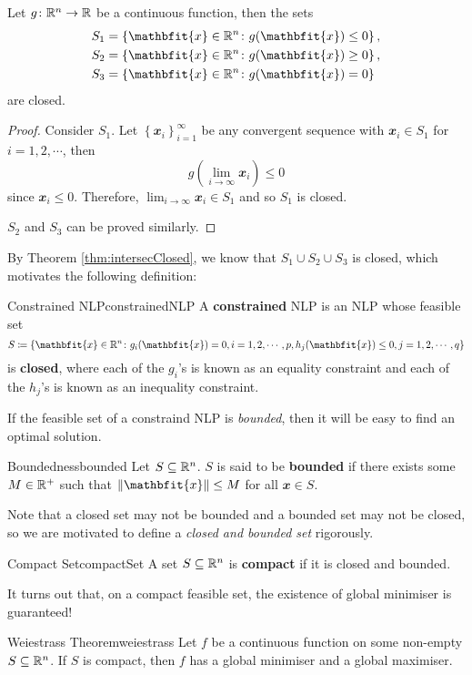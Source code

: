 \documentclass[math, code]{amznotes}
\theoremstyle{remark}
\begin{document}
\begin{probox}{}{}
    Let $g \colon \mathbb{R}^n \to \mathbb{R}$ be a continuous function, then the sets
    \begin{align*}
        S_1 & = \left\{\mathbfit{x} \in \R^n \colon g(\mathbfit{x}) \leq 0\right\}, \\
        S_2 & = \left\{\mathbfit{x} \in \R^n \colon g(\mathbfit{x}) \geq 0\right\}, \\
        S_3 & = \left\{\mathbfit{x} \in \R^n \colon g(\mathbfit{x}) = 0\right\}
    \end{align*}
    are closed.
    \tcblower
    \begin{proof}
        Consider $S_1$. Let $\left\{\mathbfit{x}_i\right\}_{i = 1}^\infty$ be any convergent sequence with $\mathbfit{x}_i \in S_1$ for $i = 1, 2, \cdots$, then
        \begin{equation*}
            g\left(\lim_{i \to \infty}\mathbfit{x}_i\right) \leq 0
        \end{equation*}
        since $\mathbfit{x}_i \leq 0$. Therefore, $\lim_{i \to \infty}\mathbfit{x}_i \in S_1$ and so $S_1$ is closed.

        $S_2$ and $S_3$ can be proved similarly.
    \end{proof}
\end{probox}
By Theorem \ref{thm:intersecClosed}, we know that $S_1 \cup S_2 \cup S_3$ is closed, which motivates the following definition:
\begin{dfnbox}{Constrained NLP}{constrainedNLP}
    A {\color{red} \textbf{constrained}} NLP is an NLP whose feasible set
    \begin{displaymath}
        S \coloneqq \left\{\mathbfit{x} \in \R^n \colon g_i(\mathbfit{x}) = 0, i = 1, 2, \cdots, p, h_j(\mathbfit{x}) \leq 0, j = 1, 2, \cdots, q\right\}
    \end{displaymath}
    is {\color{red} \textbf{closed}}, where each of the $g_i$'s is known as an equality constraint and each of the $h_j$'s is known as an inequality constraint.
\end{dfnbox}
If the feasible set of a constraind NLP is \textit{bounded}, then it will be easy to find an optimal solution.
\begin{dfnbox}{Boundedness}{bounded}
    Let $S \subseteq \mathbb{R}^n$. $S$ is said to be {\color{red} \textbf{bounded}} if there exists some $M \in \mathbb{R}^+$ such that $\norm{\mathbfit{x}} \leq M$ for all $\mathbfit{x} \in S$.
\end{dfnbox}
Note that a closed set may not be bounded and a bounded set may not be closed, so we are motivated to define a \textit{closed and bounded set} rigorously.
\begin{dfnbox}{Compact Set}{compactSet}
    A set $S \subseteq \mathbb{R}^n$ is {\color{red} \textbf{compact}} if it is closed and bounded.
\end{dfnbox}
It turns out that, on a compact feasible set, the existence of global minimiser is guaranteed!
\begin{thmbox}{Weiestrass Theorem}{weiestrass}
    Let $f$ be a continuous function on some non-empty $S \subseteq \mathbb{R}^n$. If $S$ is compact, then $f$ has a global minimiser and a global maximiser.
\end{thmbox}
\end{document}
